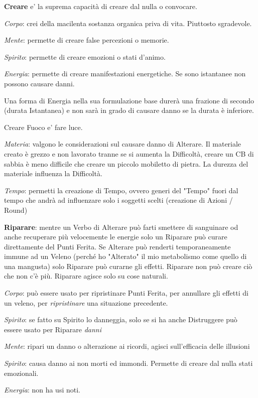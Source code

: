 \documentclass[a4paper,twoside,openany]{book}
\begin{document}
\begin{multicols}{2}
\textbf{Creare} e' la suprema capacità di creare dal nulla o convocare.

\textit{Corpo}: crei della macilenta sostanza organica priva di vita. Piuttosto sgradevole.

\textit{Mente}: permette di creare false percezioni o memorie. 

\textit{Spirito}: permette di creare emozioni o stati d'animo. 

\textit{Energia}: permette di creare manifestazioni energetiche. Se sono istantanee non possono causare danni.

Una forma di Energia nella sua formulazione base durerà una frazione di secondo (durata Istantanea) e non sarà in grado di causare danno se la durata è inferiore.

Creare Fuoco e' fare luce.

\textit{Materia}: valgono le considerazioni sul causare danno di Alterare. Il materiale creato è grezzo e non lavorato tranne se si aumenta la Difficoltà, creare un CB di sabbia è meno difficile che creare un piccolo mobiletto di pietra. La durezza del materiale influenza la Difficoltà.

\textit{Tempo}: permetti la creazione di Tempo, ovvero generi del "Tempo" fuori dal tempo che andrà ad influenzare solo i soggetti scelti (creazione di Azioni / Round)

\textbf{Riparare}: mentre un Verbo di Alterare può farti smettere di sanguinare od anche recuperare più velocemente le energie solo un Riparare può curare direttamente del Punti Ferita. Se Alterare può renderti temporaneamente immune ad un Veleno (perché ho "Alterato" il mio metabolismo come quello di una mangusta) solo Riparare può curarne gli effetti. Riparare non può creare ciò che non c'è più. Riparare agisce solo su cose naturali.

\textit{Corpo}: può essere usato per ripristinare Punti Ferita, per annullare gli effetti di un veleno, per \emph{ripristinare} una situazione precedente.

\textit{Spirito}: se fatto su Spirito lo danneggia, solo se si ha anche Distruggere può essere usato per Riparare \emph{danni}

\textit{Mente}: ripari un danno o alterazione ai ricordi, agisci sull'efficacia delle illusioni

\textit{Spirito}: causa danno ai non morti ed immondi. Permette di creare dal nulla stati emozionali.

\textit{Energia}: non ha usi noti.


\end{multicols}
\end{document}
